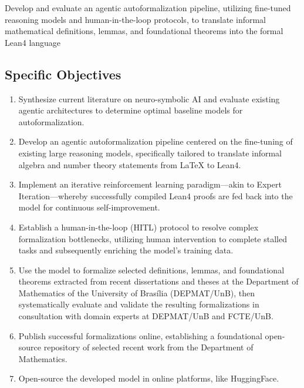 Develop and evaluate an agentic autoformalization pipeline, utilizing fine-tuned reasoning models and human-in-the-loop protocols, to translate informal mathematical definitions, lemmas, and foundational theorems into the formal Lean4 language

\subsection{Specific Objectives}

\begin{enumerate}
    \item Synthesize current literature on neuro-symbolic AI and evaluate existing agentic architectures to determine optimal baseline models for autoformalization.
    \item Develop an agentic autoformalization pipeline centered on the fine-tuning of existing large reasoning models, specifically tailored to translate informal algebra and number theory statements from LaTeX to Lean4.
    \item Implement an iterative reinforcement learning paradigm—akin to Expert Iteration—whereby successfully compiled Lean4 proofs are fed back into the model for continuous self-improvement.
    \item Establish a human-in-the-loop (HITL) protocol to resolve complex formalization bottlenecks, utilizing human intervention to complete stalled tasks and subsequently enriching the model's training data.
    \item Use the model to formalize selected definitions, lemmas, and foundational theorems extracted from recent dissertations and theses at the Department of Mathematics of the University of Brasília (DEPMAT/UnB), then systematically evaluate and validate the resulting formalizations in consultation with domain experts at DEPMAT/UnB and FCTE/UnB.
    \item Publish successful formalizations online, establishing a foundational open-source repository of selected recent work from the Department of Mathematics.
    \item Open-source the developed model in online platforms, like HuggingFace.
\end{enumerate}